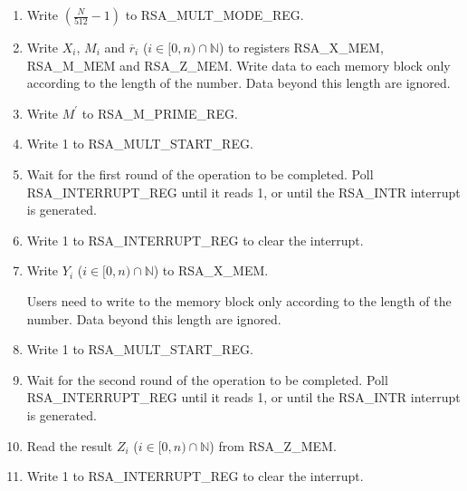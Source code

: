 \documentclass[main\_\_EN.tex]{subfiles}
\begin{document}
\begin{enumerate}

    \item Write \begin{math}( \frac{N}{512} - 1 )\end{math} to RSA\_MULT\_MODE\_REG.

    \item Write
        \begin{math}X_{i}\end{math}, 
        \begin{math}M_{i}\end{math} and
        \begin{math}\overline{r}_{i}\end{math}
        (\begin{math}i \in [0,n) \cap \mathbb{N}\end{math}) to registers RSA\_X\_MEM, RSA\_M\_MEM and RSA\_Z\_MEM. Write data to each memory block only according to the length of the number. Data beyond this length are ignored.
    \item Write \begin{math}M^{\prime}\end{math} to RSA\_M\_PRIME\_REG.

    \item Write 1 to RSA\_MULT\_START\_REG.

    \item Wait for the first round of the operation to be completed. Poll RSA\_INTERRUPT\_REG until it reads 1, or until the RSA\_INTR interrupt is generated.
        
    \item Write 1 to RSA\_INTERRUPT\_REG to clear the interrupt.

    \item Write 
        \begin{math}Y_{i}\end{math}
        (\begin{math}i \in [0,n) \cap \mathbb{N}\end{math})
  to RSA\_X\_MEM.
  
Users need to write to the memory block only according to the length of the number. Data beyond this length are ignored.

    \item Write 1 to RSA\_MULT\_START\_REG.

    \item Wait for the second round of the operation to be completed. Poll RSA\_INTERRUPT\_REG until it reads 1, or until the RSA\_INTR interrupt is generated.
    
    \item Read the result \begin{math}Z_{i}\end{math}
        (\begin{math}i \in [0,n) \cap \mathbb{N}\end{math}) from RSA\_Z\_MEM.

    \item Write 1 to RSA\_INTERRUPT\_REG to clear the interrupt.

\end{enumerate}
\end{document}
